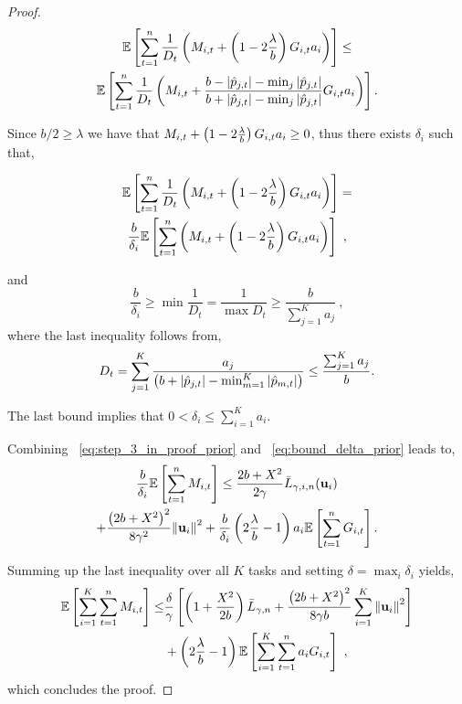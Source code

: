 {\begin{proof}
\begin{multline*}
\mathbb{E}\left[{\sum_{t=1}^{n}{\frac{1}{D_{t}}}\left({M_{i,t}+\left({1-2\frac{\lambda}{b}}\right)G_{i,t}a_{i} }\right)}\right]
\le \\
\mathbb{E}\left[ \sum_{t=1}^{n}{\frac{1}{D_{t}}}\left({M_{i,t}+\frac{b-\left\vert{\hat{p}_{j,t}}\right\vert-\min_{j}{\left\vert{\hat{p}_{j,t}}\right\vert }}{b+\left\vert{\hat{p}_{j,t}}\right\vert-\min_{j}{\left\vert{\hat{p}_{j,t}}\right\vert}}G_{i,t}a_{i} }\right) \right].
\end{multline*}

\noindent
Since $b/2 \geq \lambda$ we have that
$M_{i,t}+\left({1-2\frac{\lambda}{b}}\right)G_{i,t}a_{i}\geq 0$, thus there
exists $\delta_i$ such that, 

\begin{multline}
  \label{eq:bound_delta_prior}
\mathbb{E}\left[
  \sum_{t=1}^{n}{\frac{1}{D_{t}}}\left({M_{i,t}+\left({1-2\frac{\lambda}{b}}\right)G_{i,t}a_{i}
  }\right) \right]= \\
  \frac{b}{\delta_i}\mathbb{E}\left[
  \sum_{t=1}^{n}\left({M_{i,t}+\left({1-2\frac{\lambda}{b}}\right)G_{i,t}a_{i}
  }\right) \right] ~,
\end{multline}

\noindent
and 
\[
\frac{b}{\delta_i} \geq \min\frac{1}{D_t}  = \frac{1}{\max D_t}  \geq \frac{b}{\sum_{j=1}^Ka_{j}}~,
\]
where the last inequality follows from,
\begin{equation*}
D_{t}=\sum_{j=1}^K\frac{a_{j}}{\left({b+\left\vert{\hat{p}_{j,t}}\right\vert-\min_{m=1}^K\left\vert{\hat{p}_{m,t}}\right\vert}\right)}\le \frac{\sum_{j=1}^Ka_{j}}{b}.
\end{equation*}

\noindent
The last bound implies that $0<\delta_i\le\sum_{i=1}^Ka_{i  }$.

\noindent
Combining ~\eqref{eq:step_3_in_proof_prior} and ~\eqref{eq:bound_delta_prior} leads to, 
\begin{multline*}
\label{eq:bound_for_i}
\frac{b}{\delta_i}\mathbb{E}\left[ \sum_{t=1}^{n}{M_{i,t}} \right]
\le \frac{2b+X^2}{2\gamma}{\bar L}_{\gamma,i,n}(\mathbf{u}_{i}) 
\\+\frac{\left({2b+X^2}\right)^2}{8{\gamma}^2}{\left\Vert \mathbf{u}_{i} \right\Vert}^2 
+\frac{b}{\delta_i}\left({2\frac{\lambda}{b}-1}\right)a_{i}\mathbb{E}\left[{\sum_{t=1}^{n}{G_{i,t}}}\right].
\end{multline*}

\noindent
Summing up the last inequality over all $K$ tasks and setting $\delta
= \max_i \delta_i$ yields,
\begin{equation*}
\begin{split}
\mathbb{E}\left[ \sum_{i=1}^{K}\sum_{t=1}^{n}{M_{i,t}} \right]
\le&\frac{\delta}{\gamma }\left[{\left(1+\frac{X^2}{2b} \right){\bar L}_{\gamma,n}+
\frac{\left({2b+X^2}\right)^2}{8{\gamma}b}\sum_{i=1}^{K}{{\left\Vert \mathbf{u}_{i} \right\Vert}^2}}\right]\\ 
&+
\left({2\frac{\lambda}{b}-1}\right)\mathbb{E}\left[{\sum_{i=1}^{K}\sum_{t=1}^{n}{a_{i}G_{i,t}}}\right]~,
\end{split}
\end{equation*}
which concludes the proof.
\QED
\end{proof}

}
